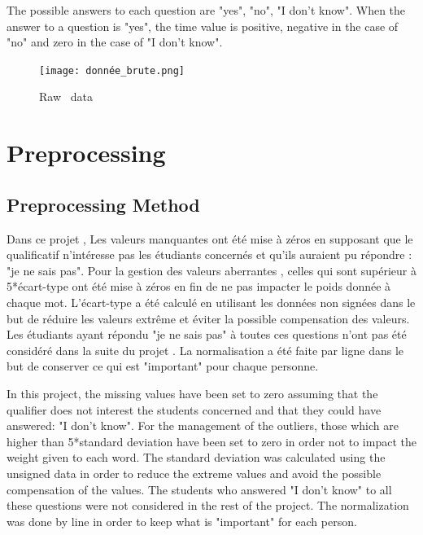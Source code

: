 \documentclass[12pt]{article}
\begin{document}
The possible answers to each question are "yes", "no", "I don't know". When the answer to a question is "yes", the time value is positive, negative in the case of "no" and zero in the case of "I don't know".






\begin{figure}[h]
\begin{center}
\texttt{[image: donnée\_brute.png]} 
\caption[]{ Raw \ data}
\end{center}
\end{figure}


\section{Preprocessing}

\subsection{Preprocessing Method}

Dans ce projet , Les valeurs manquantes ont été mise à zéros en supposant que le qualificatif n'intéresse pas les étudiants concernés et qu'ils auraient pu  répondre : "je ne sais pas".
Pour la gestion des valeurs aberrantes , celles qui sont  supérieur à 5*écart-type ont été mise à zéros en fin de ne pas impacter le poids donnée à chaque  mot. L'écart-type a été calculé en utilisant les données non signées dans le but de réduire les valeurs extrême et éviter la possible compensation des valeurs.
Les étudiants ayant répondu "je ne sais pas" à toutes ces questions n'ont pas été considéré dans la suite du projet .  
La normalisation a été faite par ligne dans le but de conserver ce qui est "important" pour chaque personne. 



In this project, the missing values have been set to zero assuming that the qualifier does not interest the students concerned and that they could have answered: "I don't know".
For the management of the outliers, those which are higher than 5*standard deviation have been set to zero in order not to impact the weight given to each word. The standard deviation was calculated using the unsigned data in order to reduce the extreme values and avoid the possible compensation of the values.
The students who answered "I don't know" to all these questions were not considered in the rest of the project.  
The normalization was done by line in order to keep what is "important" for each person. 
\end{document}
